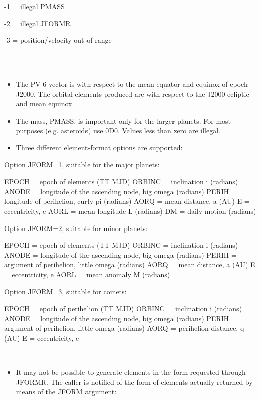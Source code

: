 \documentclass[twoside,11pt]{article}
\renewcommand{\_}{\texttt{\symbol{95}}}
\newcommand{\sstnotes}[1]{\goodbreak \item[Notes:] \mbox{} \\[1.3ex] #1}
\newcommand{\sstitemlist}[1]{
  \mbox{} \\
  \vspace{-3.5ex}
  \begin{itemize}
     #1
  \end{itemize}
}
\newcommand{\sstitem}{\item}
\newcommand{\sstnotes}[1]{\item[Notes:] #1 }
\newcommand{\sstitemlist}[1]{
      \begin{itemize}
         #1
      \end{itemize}
      \\
   }
\newcommand{\sstitem}{\item}
\begin{document}
{{{{            \sstitem
                   -1 = illegal PMASS

            \sstitem
                   -2 = illegal JFORMR

            \sstitem
                   -3 = position/velocity out of range
         }
      }
   }
   \sstnotes{
      \sstitemlist{

         \sstitem
         The PV 6-vector is with respect to the mean equator and equinox of
           epoch J2000.  The orbital elements produced are with respect to
           the J2000 ecliptic and mean equinox.

         \sstitem
         The mass, PMASS, is important only for the larger planets.  For
           most purposes (e.g. asteroids) use 0D0.  Values less than zero
           are illegal.

         \sstitem
         Three different element-format options are supported:

      }
        Option JFORM=1, suitable for the major planets:

        EPOCH  = epoch of elements (TT MJD)
        ORBINC = inclination i (radians)
        ANODE  = longitude of the ascending node, big omega (radians)
        PERIH  = longitude of perihelion, curly pi (radians)
        AORQ   = mean distance, a (AU)
        E      = eccentricity, e
        AORL   = mean longitude L (radians)
        DM     = daily motion (radians)

        Option JFORM=2, suitable for minor planets:

        EPOCH  = epoch of elements (TT MJD)
        ORBINC = inclination i (radians)
        ANODE  = longitude of the ascending node, big omega (radians)
        PERIH  = argument of perihelion, little omega (radians)
        AORQ   = mean distance, a (AU)
        E      = eccentricity, e
        AORL   = mean anomaly M (radians)

        Option JFORM=3, suitable for comets:

        EPOCH  = epoch of perihelion (TT MJD)
        ORBINC = inclination i (radians)
        ANODE  = longitude of the ascending node, big omega (radians)
        PERIH  = argument of perihelion, little omega (radians)
        AORQ   = perihelion distance, q (AU)
        E      = eccentricity, e

      \sstitemlist{

         \sstitem
         It may not be possible to generate elements in the form
           requested through JFORMR.  The caller is notified of the form
           of elements actually returned by means of the JFORM argument:

}}}
\end{document}

